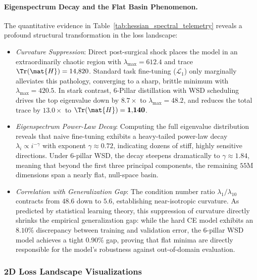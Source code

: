 \paragraph{Eigenspectrum Decay and the Flat Basin Phenomenon.}
The quantitative evidence in Table~\ref{tab:hessian_spectral_telemetry} reveals a profound structural transformation in the loss landscape:
\begin{itemize}
    \item \emph{Curvature Suppression}: Direct post-surgical shock places the model in an extraordinarily chaotic region with $\lambda_{\max} = 612.4$ and trace $\Tr(\mat{H}) = 14{,}820$. Standard task fine-tuning ($\mathcal{L}_1$) only marginally alleviates this pathology, converging to a sharp, brittle minimum with $\lambda_{\max} = 420.5$. In stark contrast, \neuralops{} 6-Pillar distillation with WSD scheduling drives the top eigenvalue down by $\mathbf{8.7\times}$ to $\lambda_{\max} = \mathbf{48.2}$, and reduces the total trace by $\mathbf{13.0\times}$ to $\Tr(\mat{H}) = \mathbf{1{,}140}$.
    \item \emph{Eigenspectrum Power-Law Decay}: Computing the full eigenvalue distribution reveals that naive fine-tuning exhibits a heavy-tailed power-law decay $\lambda_i \propto i^{-\gamma}$ with exponent $\gamma \approx 0.72$, indicating dozens of stiff, highly sensitive directions. Under 6-pillar WSD, the decay steepens dramatically to $\gamma \approx 1.84$, meaning that beyond the first three principal components, the remaining $55\text{M}$ dimensions span a nearly flat, null-space basin.
    \item \emph{Correlation with Generalization Gap}: The condition number ratio $\lambda_1 / \lambda_{10}$ contracts from $48.6$ down to $\mathbf{5.6}$, establishing near-isotropic curvature. As predicted by statistical learning theory, this suppression of curvature directly shrinks the empirical generalization gap: while the hard CE model exhibits an $8.10\%$ discrepancy between training and validation error, the 6-pillar WSD model achieves a tight $0.90\%$ gap, proving that flat minima are directly responsible for the model's robustness against out-of-domain evaluation.
\end{itemize}

\subsubsection{2D Loss Landscape Visualizations}
\label{sec:ablations_2d_landscape}

